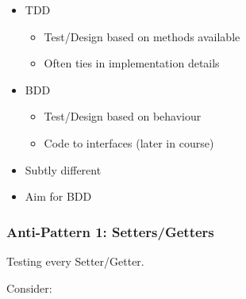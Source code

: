 \begin{itemize}
\tightlist
\item
  TDD

  \begin{itemize}
  \tightlist
  \item
    Test/Design based on methods available
  \item
    Often ties in implementation details
  \end{itemize}
\item
  BDD

  \begin{itemize}
  \tightlist
  \item
    Test/Design based on behaviour\\
  \item
    Code to interfaces (later in course)
  \end{itemize}
\item
  Subtly different
\item
  Aim for BDD
\end{itemize}

\hypertarget{anti-pattern-1-settersgetters}{%
\subsubsection{Anti-Pattern 1:
Setters/Getters}\label{anti-pattern-1-settersgetters}}

Testing every Setter/Getter.

Consider:

\begin{Shaded}
\begin{Highlighting}[]

     \NormalTok{:}
        
       \NormalTok{ \{ } \NormalTok{; \}}
        
       \NormalTok{ \{ } \NormalTok{; \}}
     \NormalTok{:}
        \NormalTok{;}
       \NormalTok{;}
\NormalTok{   \};}
\end{Highlighting}
\end{Shaded}

